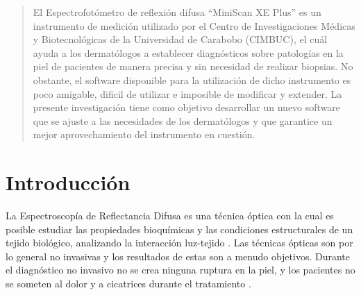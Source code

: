 \documentclass[conference]{IEEEtran}
\begin{document}
\begin{abstract}
El Espectrofot\'{o}metro de reflexi\'{o}n difusa ``MiniScan XE Plus'' es un instrumento de medici\'{o}n utilizado por el Centro de Investigaciones M\'{e}dicas y Biotecnol\'{o}gicas de la Universidad de Carabobo (CIMBUC), el cu\'{a}l ayuda a los dermat\'{o}logos a establecer diagn\'{o}sticos sobre patolog\'{i}as en la piel de pacientes de manera precisa y sin necesidad de realizar biopsias. No obstante, el software disponible para la utilizaci\'{o}n de dicho instrumento es poco amigable, dificil de utilizar e imposible de modificar y extender. La presente investigaci\'{o}n tiene como objetivo desarrollar un nuevo software que se ajuste a las necesidades de los dermat\'{o}logos y que garantice un mejor aprovechamiento del instrumento en cuesti\'{o}n.
\end{abstract}





%
\IEEEpeerreviewmaketitle

\section{Introducci\'{o}n}

La Espectroscop\'{i}a de Reflectancia Difusa es una t\'{e}cnica \'{o}ptica con la cual es  posible estudiar las propiedades bioqu\'{i}micas y las condiciones estructurales de un tejido biol\'{o}gico, analizando la interacci\'{o}n luz-tejido \cite{Perez}. Las t\'{e}cnicas \'{o}pticas son por lo general no invasivas y los resultados de estas son a menudo objetivos. Durante el diagn\'{o}stico no invasivo no se crea ninguna ruptura en la piel, y los pacientes no se someten al dolor y a cicatrices durante el tratamiento \cite{Bersha}.
\end{document}
